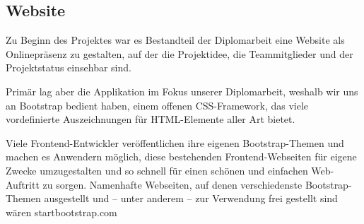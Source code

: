\subsection{Website}
Zu Beginn des Projektes war es Bestandteil der Diplomarbeit eine Website als
Onlinepräsenz zu gestalten, auf der die Projektidee, die Teammitglieder und der
Projektstatus einsehbar sind.

Primär lag aber die Applikation im Fokus unserer Diplomarbeit, weshalb wir uns
an Bootstrap bedient haben, einem offenen CSS-Framework, das viele vordefinierte
Auszeichnungen für HTML-Elemente aller Art bietet.

Viele Frontend-Entwickler veröffentlichen ihre eigenen Bootstrap-Themen und 
machen es Anwendern möglich, diese bestehenden Frontend-Webseiten für eigene
Zwecke umzugestalten und so schnell für einen schönen und einfachen Web-Auftritt
zu sorgen. Namenhafte Webseiten, auf denen verschiedenste Bootstrap-Themen
ausgestellt und -- unter anderem -- zur Verwendung frei gestellt sind wären
startbootstrap.com
